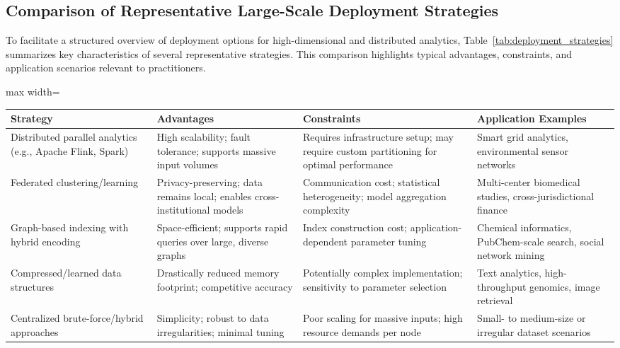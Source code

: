 \documentclass[sigconf]{acmart}
\begin{document}
\subsection{Comparison of Representative Large-Scale Deployment Strategies}

To facilitate a structured overview of deployment options for high-dimensional and distributed analytics, Table~\ref{tab:deployment_strategies} summarizes key characteristics of several representative strategies. This comparison highlights typical advantages, constraints, and application scenarios relevant to practitioners.

\begin{table*}[htbp]
\centering
\caption{Comparison of large-scale deployment strategies for clustering and analytics.}
\label{tab:deployment_strategies}
\begin{adjustbox}{max width=\textwidth}
\begin{tabular}{llll}
\toprule
\textbf{Strategy} & \textbf{Advantages} & \textbf{Constraints} & \textbf{Application Examples} \\
\midrule
Distributed parallel analytics (e.g., Apache Flink, Spark) & High scalability; fault tolerance; supports massive input volumes & Requires infrastructure setup; may require custom partitioning for optimal performance & Smart grid analytics, environmental sensor networks \\
Federated clustering/learning & Privacy-preserving; data remains local; enables cross-institutional models & Communication cost; statistical heterogeneity; model aggregation complexity & Multi-center biomedical studies, cross-jurisdictional finance \\
Graph-based indexing with hybrid encoding & Space-efficient; supports rapid queries over large, diverse graphs & Index construction cost; application-dependent parameter tuning & Chemical informatics, PubChem-scale search, social network mining \\
Compressed/learned data structures & Drastically reduced memory footprint; competitive accuracy & Potentially complex implementation; sensitivity to parameter selection & Text analytics, high-throughput genomics, image retrieval \\
Centralized brute-force/hybrid approaches & Simplicity; robust to data irregularities; minimal tuning & Poor scaling for massive inputs; high resource demands per node & Small- to medium-size or irregular dataset scenarios \\
\bottomrule
\end{tabular}
\end{adjustbox}
\end{table*}
\end{document}

